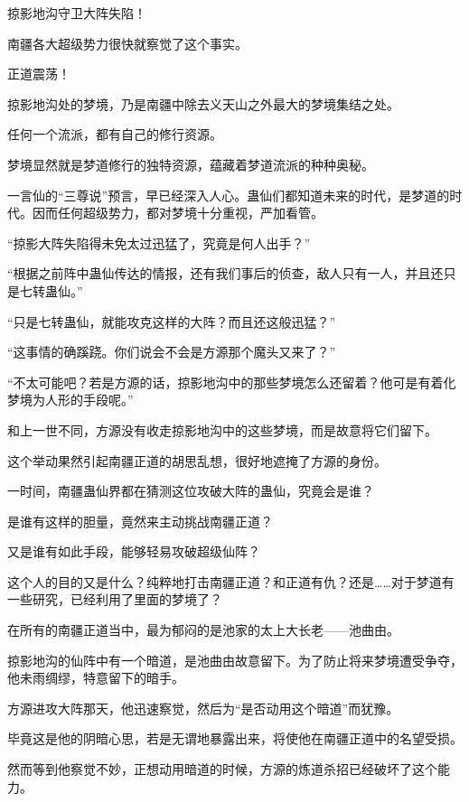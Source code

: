 
\begin{this_body}



掠影地沟守卫大阵失陷！

南疆各大超级势力很快就察觉了这个事实。

正道震荡！

掠影地沟处的梦境，乃是南疆中除去义天山之外最大的梦境集结之处。

任何一个流派，都有自己的修行资源。

梦境显然就是梦道修行的独特资源，蕴藏着梦道流派的种种奥秘。

一言仙的“三尊说”预言，早已经深入人心。蛊仙们都知道未来的时代，是梦道的时代。因而任何超级势力，都对梦境十分重视，严加看管。

“掠影大阵失陷得未免太过迅猛了，究竟是何人出手？”

“根据之前阵中蛊仙传达的情报，还有我们事后的侦查，敌人只有一人，并且还只是七转蛊仙。”

“只是七转蛊仙，就能攻克这样的大阵？而且还这般迅猛？”

“这事情的确蹊跷。你们说会不会是方源那个魔头又来了？”

“不太可能吧？若是方源的话，掠影地沟中的那些梦境怎么还留着？他可是有着化梦境为人形的手段呢。”

和上一世不同，方源没有收走掠影地沟中的这些梦境，而是故意将它们留下。

这个举动果然引起南疆正道的胡思乱想，很好地遮掩了方源的身份。

一时间，南疆蛊仙界都在猜测这位攻破大阵的蛊仙，究竟会是谁？

是谁有这样的胆量，竟然来主动挑战南疆正道？

又是谁有如此手段，能够轻易攻破超级仙阵？

这个人的目的又是什么？纯粹地打击南疆正道？和正道有仇？还是……对于梦道有一些研究，已经利用了里面的梦境了？

在所有的南疆正道当中，最为郁闷的是池家的太上大长老——池曲由。

掠影地沟的仙阵中有一个暗道，是池曲由故意留下。为了防止将来梦境遭受争夺，他未雨绸缪，特意留下的暗手。

方源进攻大阵那天，他迅速察觉，然后为“是否动用这个暗道”而犹豫。

毕竟这是他的阴暗心思，若是无谓地暴露出来，将使他在南疆正道中的名望受损。

然而等到他察觉不妙，正想动用暗道的时候，方源的炼道杀招已经破坏了这个能力。


\end{this_body}
